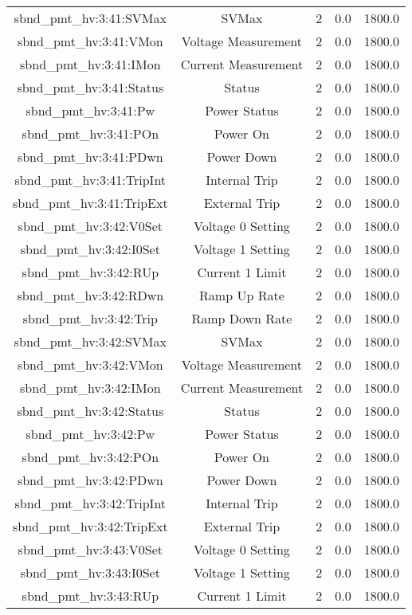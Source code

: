 \begin{table}[ptb]
\begin{tabular}{c | c c c c}
sbnd_pmt_hv:3:41:SVMax & SVMax & 2 & 0.0 & 1800.0\\ 
sbnd_pmt_hv:3:41:VMon & Voltage Measurement & 2 & 0.0 & 1800.0\\ 
sbnd_pmt_hv:3:41:IMon & Current Measurement & 2 & 0.0 & 1800.0\\ 
sbnd_pmt_hv:3:41:Status & Status & 2 & 0.0 & 1800.0\\ 
sbnd_pmt_hv:3:41:Pw & Power Status & 2 & 0.0 & 1800.0\\ 
sbnd_pmt_hv:3:41:POn & Power On & 2 & 0.0 & 1800.0\\ 
sbnd_pmt_hv:3:41:PDwn & Power Down & 2 & 0.0 & 1800.0\\ 
sbnd_pmt_hv:3:41:TripInt & Internal Trip & 2 & 0.0 & 1800.0\\ 
sbnd_pmt_hv:3:41:TripExt & External Trip & 2 & 0.0 & 1800.0\\ 
sbnd_pmt_hv:3:42:V0Set & Voltage 0 Setting & 2 & 0.0 & 1800.0\\ 
sbnd_pmt_hv:3:42:I0Set & Voltage 1 Setting & 2 & 0.0 & 1800.0\\ 
sbnd_pmt_hv:3:42:RUp & Current 1 Limit & 2 & 0.0 & 1800.0\\ 
sbnd_pmt_hv:3:42:RDwn & Ramp Up Rate & 2 & 0.0 & 1800.0\\ 
sbnd_pmt_hv:3:42:Trip & Ramp Down Rate & 2 & 0.0 & 1800.0\\ 
sbnd_pmt_hv:3:42:SVMax & SVMax & 2 & 0.0 & 1800.0\\ 
sbnd_pmt_hv:3:42:VMon & Voltage Measurement & 2 & 0.0 & 1800.0\\ 
sbnd_pmt_hv:3:42:IMon & Current Measurement & 2 & 0.0 & 1800.0\\ 
sbnd_pmt_hv:3:42:Status & Status & 2 & 0.0 & 1800.0\\ 
sbnd_pmt_hv:3:42:Pw & Power Status & 2 & 0.0 & 1800.0\\ 
sbnd_pmt_hv:3:42:POn & Power On & 2 & 0.0 & 1800.0\\ 
sbnd_pmt_hv:3:42:PDwn & Power Down & 2 & 0.0 & 1800.0\\ 
sbnd_pmt_hv:3:42:TripInt & Internal Trip & 2 & 0.0 & 1800.0\\ 
sbnd_pmt_hv:3:42:TripExt & External Trip & 2 & 0.0 & 1800.0\\ 
sbnd_pmt_hv:3:43:V0Set & Voltage 0 Setting & 2 & 0.0 & 1800.0\\ 
sbnd_pmt_hv:3:43:I0Set & Voltage 1 Setting & 2 & 0.0 & 1800.0\\ 
sbnd_pmt_hv:3:43:RUp & Current 1 Limit & 2 & 0.0 & 1800.0\\ 

\end{tabular}
\end{table}

